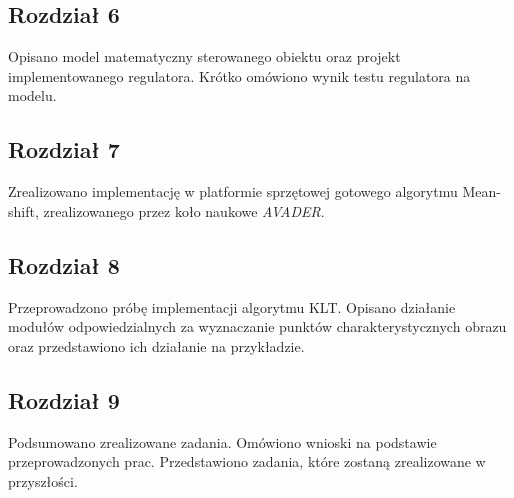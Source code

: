 \subsection{Rozdział 6}
Opisano model matematyczny sterowanego obiektu oraz projekt implementowanego regulatora. Krótko omówiono wynik testu regulatora na modelu.

\subsection{Rozdział 7}
Zrealizowano implementację w platformie sprzętowej gotowego algorytmu Mean-shift, zrealizowanego przez koło naukowe \textit{AVADER}.

\subsection{Rozdział 8}
Przeprowadzono próbę implementacji algorytmu KLT. Opisano działanie modułów odpowiedzialnych za wyznaczanie punktów charakterystycznych obrazu oraz przedstawiono ich działanie na przykładzie.

\subsection{Rozdział 9}
Podsumowano zrealizowane zadania. Omówiono wnioski na podstawie przeprowadzonych prac. Przedstawiono zadania, które zostaną zrealizowane w przyszłości.